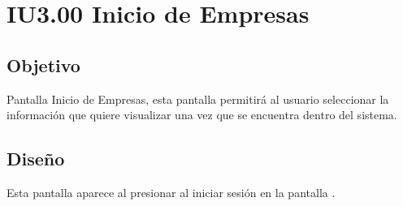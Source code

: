 
\section{IU3.00 Inicio de Empresas}

\subsection{Objetivo}
	Pantalla Inicio de Empresas, esta pantalla permitirá al usuario seleccionar la información que quiere visualizar una vez que se encuentra dentro del sistema.
	


\subsection{Diseño}
    Esta pantalla aparece al presionar al iniciar sesión en la pantalla  .

	
